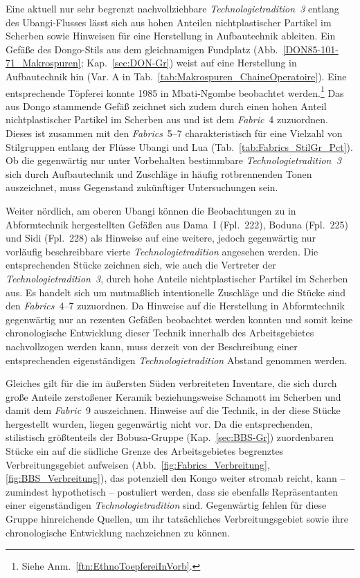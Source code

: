 Eine aktuell nur sehr begrenzt nachvollziehbare \textit{Technologietradition~3} entlang des \mbox{Ubangi}-Flusses lässt sich aus hohen Anteilen nichtplastischer Partikel im Scherben sowie Hinweisen für eine Herstellung in Aufbautechnik ableiten. Ein Gefäße des Dongo-Stils aus dem gleichnamigen Fundplatz (Abb.~\ref{DON85-101-71_Makrospuren}; Kap.~\ref{sec:DON-Gr}) weist auf eine Herstellung in Aufbautechnik hin (Var. A in Tab.~\ref{tab:Makrospuren_ChaineOperatoire}). Eine entsprechende Töpferei konnte 1985 in Mbati-Ngombe beobachtet werden.\footnote{Siehe Anm.~\ref{ftn:EthnoToepfereiInVorb}.} Das aus Dongo stammende Gefäß zeichnet sich zudem durch einen hohen Anteil nichtplastischer Partikel im Scherben aus und ist dem \textit{Fabric}~4 zuzuordnen. Dieses ist zusammen mit den \textit{Fabrics}~5--7 charakteristisch für eine Vielzahl von Stilgruppen entlang der Flüsse \mbox{Ubangi} und Lua (Tab.~\ref{tab:Fabrics_StilGr_Pct}). Ob die gegenwärtig nur unter Vorbehalten bestimmbare \textit{Technologietradition~3} sich durch Aufbautechnik und Zuschläge in häufig rotbrennenden Tonen auszeichnet, muss Gegenstand zukünftiger Untersuchungen sein.

Weiter nördlich, am oberen \mbox{Ubangi} können die Beobachtungen zu in Abformtechnik hergestellten Gefäßen aus Dama~I (Fpl.~222), Boduna (Fpl.~225) und Sidi (Fpl.~228) als Hinweise auf eine weitere, jedoch gegenwärtig nur vorläufig beschreibbare vierte \textit{Technologietradition} angesehen werden. Die entsprechenden Stücke zeichnen sich, wie auch die Vertreter der \textit{Technologietradition~3}, durch hohe Anteile nichtplastischer Partikel im Scherben aus. Es handelt sich um mutmaßlich intentionelle Zuschläge und die Stücke sind den \textit{Fabrics}~4--7 zuzuordnen. Da Hinweise auf die Herstellung in Abformtechnik gegenwärtig nur an rezenten Gefäßen beobachtet werden konnten und somit keine chronologische Entwicklung dieser Technik innerhalb des Arbeitsgebietes nachvollzogen werden kann, muss derzeit von der Beschreibung einer entsprechenden eigenständigen \textit{Technologietradition} Abstand genommen werden.

Gleiches gilt für die im äußersten Süden verbreiteten Inventare, die sich durch große Anteile zerstoßener Keramik beziehungsweise Schamott im Scherben und damit dem \textit{Fabric}~9 auszeichnen. Hinweise auf die Technik, in der diese Stücke hergestellt wurden, liegen gegenwärtig nicht vor. Da die entsprechenden, stilistisch größtenteils der Bobusa-Gruppe (Kap.~\ref{sec:BBS-Gr}) zuordenbaren Stücke ein auf die südliche Grenze des Arbeitsgebietes begrenztes Verbreitungsgebiet aufweisen (Abb.~\ref{fig:Fabrics_Verbreitung}, \ref{fig:BBS_Verbreitung}), das potenziell den Kongo weiter stromab reicht, kann -- zumindest hypothetisch -- postuliert werden, dass sie ebenfalls Repräsentanten einer eigenständigen \textit{Technologietradition} sind. Gegenwärtig fehlen für diese Gruppe hinreichende Quellen, um ihr tatsächliches Verbreitungsgebiet sowie ihre chronologische Entwicklung nachzeichnen zu können.